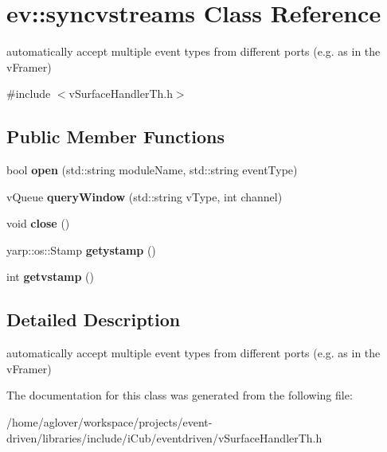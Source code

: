 \hypertarget{classev_1_1syncvstreams}{}\section{ev\+:\+:syncvstreams Class Reference}
\label{classev_1_1syncvstreams}


automatically accept multiple event types from different ports (e.\+g. as in the v\+Framer)  




{\ttfamily \#include $<$v\+Surface\+Handler\+Th.\+h$>$}

\subsection*{Public Member Functions}
\begin{DoxyCompactItemize}
\item 
bool {\bfseries open} (std\+::string module\+Name, std\+::string event\+Type)\hypertarget{classev_1_1syncvstreams_acc652540f64e92a0528e25932ff51d8f}{}\label{classev_1_1syncvstreams_acc652540f64e92a0528e25932ff51d8f}

\item 
v\+Queue {\bfseries query\+Window} (std\+::string v\+Type, int channel)\hypertarget{classev_1_1syncvstreams_a347bea90f23cf334667bb3e4b7bcf7a0}{}\label{classev_1_1syncvstreams_a347bea90f23cf334667bb3e4b7bcf7a0}

\item 
void {\bfseries close} ()\hypertarget{classev_1_1syncvstreams_ae4bdb73e97024c7399d8a105bdc8425a}{}\label{classev_1_1syncvstreams_ae4bdb73e97024c7399d8a105bdc8425a}

\item 
yarp\+::os\+::\+Stamp {\bfseries getystamp} ()\hypertarget{classev_1_1syncvstreams_a61e65f054ee803198d3e642df2bc1024}{}\label{classev_1_1syncvstreams_a61e65f054ee803198d3e642df2bc1024}

\item 
int {\bfseries getvstamp} ()\hypertarget{classev_1_1syncvstreams_a8846f86bb2794a7b6117c4f9d9c9fa65}{}\label{classev_1_1syncvstreams_a8846f86bb2794a7b6117c4f9d9c9fa65}

\end{DoxyCompactItemize}


\subsection{Detailed Description}
automatically accept multiple event types from different ports (e.\+g. as in the v\+Framer) 

The documentation for this class was generated from the following file\+:\begin{DoxyCompactItemize}
\item 
/home/aglover/workspace/projects/event-\/driven/libraries/include/i\+Cub/eventdriven/v\+Surface\+Handler\+Th.\+h\end{DoxyCompactItemize}
